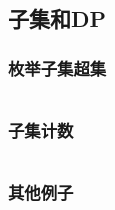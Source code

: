\documentclass[a4paper,11pt]{article}
\begin{document}
\newpage %
\subsection{子集和DP} %

\subsubsection{枚举子集超集} %
\inputminted[breaklines]{c++}{dp/子集和dp/1.cpp}
\newpage %
\subsubsection{子集计数} %
\inputminted[breaklines]{c++}{dp/子集和dp/2.cpp}
\newpage %
\subsubsection{其他例子} %
\inputminted[breaklines]{c++}{dp/子集和dp/3.cpp}
\newpage %

\end{document}
